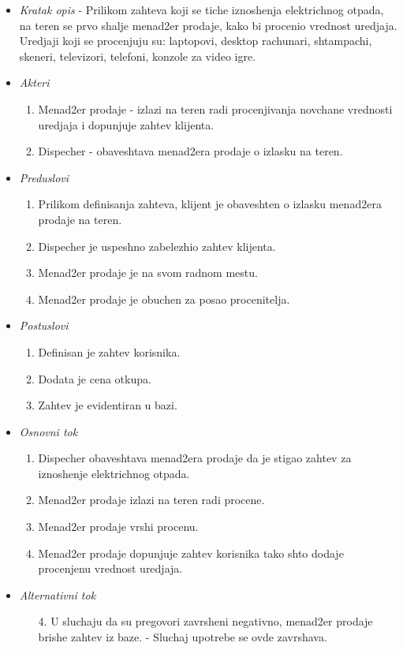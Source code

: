 \documentclass[10 pt]{article}
\begin{document}
		\begin{itemize}

			\item\textit{Kratak opis} - Prilikom zahteva koji se tiche iznoshenja elektrichnog otpada, na teren se prvo shalje menad2er prodaje,
			kako bi procenio vrednost uredjaja. Uredjaji koji se procenjuju su:
			laptopovi, desktop rachunari, shtampachi, skeneri, televizori, telefoni, konzole za video igre.
			
			\item\textit{Akteri}
				\begin{enumerate}
					\item Menad2er prodaje - izlazi na teren radi procenjivanja novchane vrednosti uredjaja i dopunjuje zahtev klijenta.
					\item Dispecher - obaveshtava menad2era prodaje o izlasku na teren.
				\end{enumerate}
			
			\item\textit{Preduslovi} 
				\begin{enumerate} 
					\item Prilikom definisanja zahteva, klijent je obaveshten o izlasku menad2era prodaje na teren.
					\item Dispecher je uspeshno zabelezhio zahtev klijenta.
					\item Menad2er prodaje je na svom radnom mestu.
					\item Menad2er prodaje je obuchen za posao procenitelja.
				\end{enumerate}			
			
			\item\textit{Postuslovi}
				\begin{enumerate}
					\item Definisan je zahtev korisnika. 
					\item Dodata je cena otkupa.
					\item Zahtev je evidentiran u bazi.
				\end{enumerate}
			
			\item\textit{Osnovni tok}
				\begin{enumerate} 
					\item Dispecher obaveshtava menad2era prodaje da je stigao zahtev za iznoshenje elektrichnog otpada.
					\item Menad2er prodaje izlazi na teren radi procene.
					\item Menad2er prodaje vrshi procenu.
					\item Menad2er prodaje dopunjuje zahtev korisnika tako shto dodaje procenjenu vrednost uredjaja.
				\end{enumerate}
			
			\item\textit{Alternativni tok}
				\begin{enumerate}
					\item [4.] U sluchaju da su pregovori zavrsheni negativno, menad2er prodaje brishe zahtev iz baze. - Sluchaj upotrebe se ovde zavrshava.
				\end{enumerate}
			
		\end{itemize}
	
\end{document}
